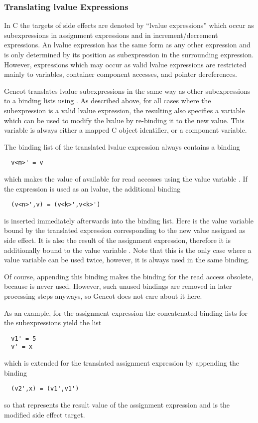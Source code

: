 \subsubsection{Translating lvalue Expressions}

In C the targets of side effects are denoted by ``lvalue expressions'' which occur as subexpressions in assignment expressions and
in increment/decrement expressions. An lvalue expression has the same form as any other expression and is only determined by its 
position as subexpression in the surrounding expression. However, expressions which may occur as valid lvalue expressions are 
restricted mainly to variables, container component accesses, and pointer dereferences.

Gencot translates lvalue subexpressions in the same way as other subexpressions to a binding lists using .
As described above, for all cases where the subexpression is a valid lvalue expression, the resulting  also
specifies a variable  which can be used to modify the lvalue by re-binding it to the new value. This variable is always
either a mapped C object identifier, or a component variable.

The binding list of the translated lvalue expression always contains a binding
\begin{verbatim}
  v<m>' = v
\end{verbatim}
which makes the value of  available for read accesses using the value variable . If the expression is used
as an lvalue, the additional binding
\begin{verbatim}
  (v<n>',v) = (v<k>',v<k>')
\end{verbatim}
is inserted immediately afterwards into the binding list.
Here  is the value variable bound by the translated expression corresponding to the new value assigned as side effect.
It is also the result of the assignment expression, therefore it is additionally bound to the value variable .
Note that this is the only case where a value variable can be used twice, however, it is always used in the same binding.

Of course, appending this binding makes the binding for the read access obsolete, because  is never
used. However, such unused bindings are removed in later processing steps anyways, so Gencot does not care about it here.

As an example, for the assignment expression  the concatenated binding lists for the subexpressions yield the
list 
\begin{verbatim}
  v1' = 5
  v' = x
\end{verbatim}
which is extended for the translated assignment expression by appending the binding
\begin{verbatim}
  (v2',x) = (v1',v1')
\end{verbatim}
so that  represents the result value of the assignment expression and  is the modified side effect target.

